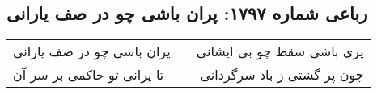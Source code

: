 \begin{center}
\section*{رباعی شماره ۱۷۹۷: پران باشی چو در صف یارانی}
\label{sec:1797}
\begin{longtable}{l p{0.5cm} r}
پران باشی چو در صف یارانی
&&
پری باشی سقط چو بی ایشانی
\\
تا پرانی تو حاکمی بر سر آن
&&
چون پر گشتی ز باد سرگردانی
\\
\end{longtable}
\end{center}
